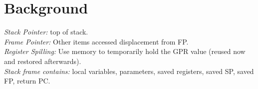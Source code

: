 \section{Background}
\emph{Stack Pointer:} top of stack.\\
\emph{Frame Pointer:} Other items accessed displacement from FP.\\
\emph{Register Spilling:} Use memory to temporarily hold the GPR value (reused now and restored afterwards).\\
\emph{Stack frame contains:} local variables, parameters, saved registers, saved SP, saved FP, return PC.